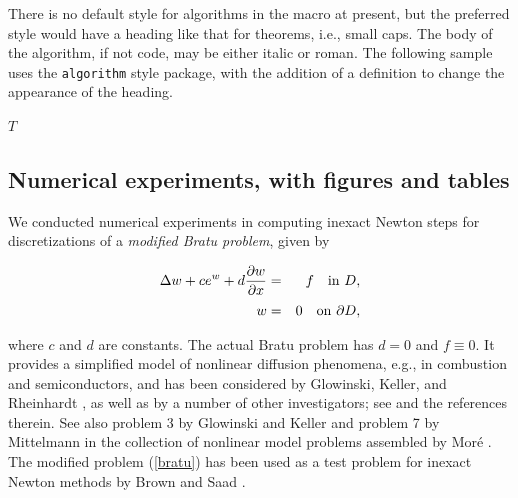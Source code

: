 \documentclass[final,leqno,onetabnum]{siamltex0315}
\def\ds{\displaystyle}
\begin{document}
There is no default style for algorithms in the macro at present, but the preferred style would have a heading like that for theorems, i.e., small caps.  The body of the algorithm, if not
code, may be either italic or roman.  The following sample uses the \texttt{algorithm} style package, with the addition of a definition to change the appearance of the heading.
\begin{algorithm}
\caption{\hspace*{-4.3pt}{.} $T = \operatorname{BuildTree}(d,p)$.}
\label{alg:buildtree}
\begin{algorithmic}
\ENDWHILE
\RETURN $T$
\end{algorithmic}
\end{algorithm}

\subsection{Numerical experiments, with figures and tables} We conducted numerical experiments 
in computing inexact Newton steps for discretizations of a  
{\em modified Bratu problem}, given by  
\begin{linenomath*}
\begin{eqnarray} 
{\ds \Delta w + c e^w + d{ {\partial w}\over{\partial x} } } 
&=&{\ds f \quad {\rm in}\ D, }\nonumber\\[-1.5ex]
\label{bratu} \\[-1.5ex]
{\ds w }&=&{\ds 0 \quad {\rm on}\ \partial D , } \nonumber
\end{eqnarray}
\end{linenomath*} 
where $c$ and $d$ are constants. The actual Bratu problem has $d=0$ and  
$f \equiv0$. It provides a simplified model of nonlinear diffusion  
phenomena, e.g., in combustion and semiconductors, and has been 
considered by Glowinski, Keller, and Rheinhardt \cite{GloKR85}, 
as well as by a number of other investigators; see \cite{GloKR85} 
and the references therein. See also problem 3 by Glowinski and  Keller  
and problem 7 by Mittelmann in the collection of nonlinear model 
problems assembled by Mor\'e \cite{More}. The modified problem  
(\ref{bratu}) has been used as a test problem for inexact Newton 
methods by Brown and Saad \cite{Brown-Saad1}.  
 
\end{document}
